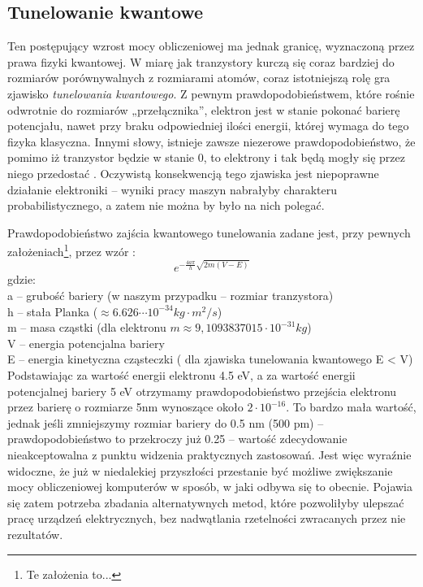 \documentclass[12pt,a4paper,twoside,openany]{book}
\begin{document}
\subsection{Tunelowanie kwantowe}

Ten postępujący wzrost mocy obliczeniowej ma jednak granicę, wyznaczoną przez prawa fizyki kwantowej. W miarę jak tranzystory kurczą się coraz bardziej do rozmiarów porównywalnych z rozmiarami atomów, coraz istotniejszą rolę gra zjawisko \textit{tunelowania kwantowego}. Z pewnym prawdopodobieństwem, które rośnie odwrotnie do rozmiarów „przełącznika”, elektron jest w stanie pokonać barierę potencjału, nawet przy braku odpowiedniej ilości energii, której wymaga do tego fizyka klasyczna. Innymi słowy, istnieje zawsze niezerowe prawdopodobieństwo, że pomimo iż tranzystor będzie w stanie 0, to elektrony i tak będą mogły się przez niego przedostać . Oczywistą konsekwencją tego zjawiska jest niepoprawne działanie elektroniki – wyniki pracy maszyn nabrałyby charakteru probabilistycznego, a zatem nie można by było na nich polegać.
	
Prawdopodobieństwo zajścia kwantowego tunelowania zadane jest, przy pewnych założeniach\footnote{Te założenia to...}, przez wzór :
\begin{equation}
e^{-\frac{4a\pi}{h}\sqrt{2m(V - E)}}
\end{equation}
gdzie: \\
\indent a – grubość bariery (w naszym przypadku – rozmiar tranzystora) \\
\indent h – stała Planka ($ \approx 6.626 \cdots 10^{-34}  kg  \cdot m^2 / s$) \\
\indent m – masa cząstki (dla elektronu $m \approx 9,109 3837015 \cdot 10^{-31} kg$) \\
\indent V – energia potencjalna bariery \\ 
\indent E – energia kinetyczna cząsteczki ( dla zjawiska tunelowania kwantowego E < V) \\

Podstawiając za wartość energii elektronu 4.5 eV, a za wartość energii potencjalnej bariery 5 eV otrzymamy prawdopodobieństwo przejścia elektronu przez barierę o rozmiarze 5nm wynoszące około $ 2 \cdot 10^{-16} $. To bardzo mała wartość, jednak jeśli zmniejszymy rozmiar bariery do 0.5 nm (500 pm) – prawdopodobieństwo to przekroczy już 0.25 – wartość zdecydowanie nieakceptowalna z punktu widzenia praktycznych zastosowań. Jest więc wyraźnie widoczne, że już w niedalekiej przyszłości przestanie być możliwe zwiększanie mocy obliczeniowej komputerów w sposób, w jaki odbywa się to obecnie. Pojawia się zatem potrzeba zbadania alternatywnych metod, które pozwoliłyby ulepszać pracę urządzeń elektrycznych, bez nadwątlania rzetelności zwracanych przez nie rezultatów.
\end{document}
